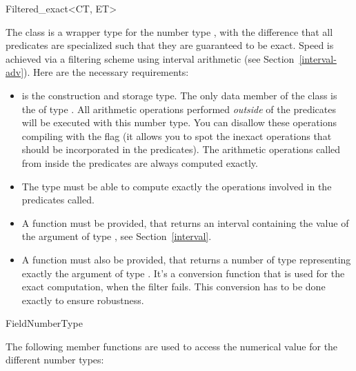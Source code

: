\begin{ccRefClass}{Filtered_exact<CT, ET>} %
\label{filter}


\ccDefinition


The class  is a wrapper type for the number
type , with the difference
that all predicates are specialized such that they are guaranteed to be exact.
Speed is achieved via a filtering scheme using interval arithmetic (see
Section~\ref{interval-adv}).  Here are the necessary requirements:

\begin{itemize}
\item {} is the construction and storage type.  The only data member of
      the class  is the  of type
      .  All arithmetic operations performed {\em outside} of the
      predicates will be executed with this number type.  You can disallow
      these operations compiling with the flag
       (it allows you
      to spot the inexact operations that should be incorporated in the
      predicates).
      The arithmetic operations called from inside the predicates are always
      computed exactly.
\item The  type must be able to compute exactly the operations involved
      in the predicates called.
\item A  function must
      be provided, that returns an interval containing the value of the
      argument of type , see Section~\ref{interval}.
\item A  function must also be provided, that
      returns a number of type  representing exactly the argument of
      type .  It's a conversion function that is used for the exact
      computation, when the filter fails.
      This conversion has to be done exactly to ensure robustness.
\end{itemize}


\ccIsModel
FieldNumberType

\ccOperations

The following member functions are used to access the numerical value for the
different number types:


\end{ccRefClass}
